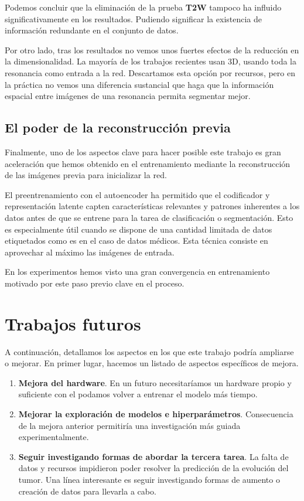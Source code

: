 Podemos concluir que la eliminación de la prueba \textbf{T2W} tampoco ha influido significativamente en los resultados. Pudiendo significar la existencia de información redundante en el conjunto de datos.

Por otro lado, tras los resultados no vemos unos fuertes efectos de la reducción en la dimensionalidad. La mayoría de los trabajos recientes usan 3D, usando toda la resonancia como entrada a la red. Descartamos esta opción por recursos, pero en la práctica no vemos una diferencia sustancial que haga que la información espacial entre imágenes de una resonancia permita segmentar mejor.


\subsection{El poder de la reconstrucción previa}

Finalmente, uno de los aspectos clave para hacer posible este trabajo es gran aceleración que hemos obtenido en el entrenamiento mediante la reconstrucción de las imágenes previa para inicializar la red.

El preentrenamiento con el autoencoder ha permitido que el codificador y representación latente capten características relevantes y patrones inherentes a los datos antes de que se entrene para la tarea de clasificación o segmentación. Esto es especialmente útil cuando se dispone de una cantidad limitada de datos etiquetados como es en el caso de datos médicos. Esta técnica consiste en aprovechar al máximo las imágenes de entrada.

En los experimentos hemos visto una gran convergencia en entrenamiento motivado por este paso previo clave en el proceso.

\section{Trabajos futuros}

A continuación, detallamos los aspectos en los que este trabajo podría ampliarse o mejorar. En primer lugar, hacemos un listado de aspectos específicos de mejora.

\begin{enumerate}
	\item \textbf{Mejora del hardware}. En un futuro necesitaríamos un hardware propio y suficiente con el podamos volver a entrenar el modelo más tiempo.
	\item \textbf{Mejorar la exploración de modelos e hiperparámetros}. Consecuencia de la mejora anterior permitiría una investigación más guiada experimentalmente.
	\item \textbf{Seguir investigando formas de abordar la tercera tarea}. La falta de datos y recursos impidieron poder resolver la predicción de la evolución del tumor. Una línea interesante es seguir investigando formas de aumento o creación de datos para llevarla a cabo.
\end{enumerate}

